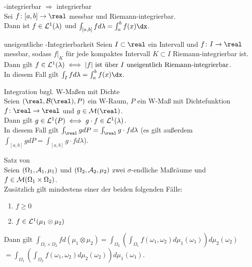 \begin{Satz}{-integrierbar $\Rightarrow$ integrierbar}\\
    Sei $f\colon [a, b] \rightarrow \real$ messbar und Riemann-integrierbar.\\
    Dann ist $f \in \mathcal{L}^1(\lambda)$ und $\int_{[a, b]} f d\lambda = \int_a^b f(x)\dx$.
\end{Satz}

\begin{Satz}{uneigentliche -Integrierbarkeit}
    Seien $I \subset \real$ ein Intervall und $f\colon I \rightarrow \real$ messbar,
    sodass $f|_K$ für jede kompaktes Intervall $K \subset I$ Riemann-integrierbar ist.\\
    Dann gilt $f \in \mathcal{L}^1(\lambda) \iff
    |f| \text{ ist über } I \text{ uneigentlich Riemann-integrierbar}$.\\
    In diesem Fall gilt $\int_I f d\lambda = \int_a^b f(x)\dx$.
\end{Satz}

\begin{Satz}{Integration bzgl. W-Maßen mit Dichte}\\
    Seien $(\real, \B(\real), P)$ ein W-Raum,
    $P$ ein W-Maß mit Dichtefunktion $f\colon \real \rightarrow \real$ und $g \in \M(\real)$.\\
    Dann gilt $g \in \mathcal{L}^1(P) \iff g \cdot f \in \mathcal{L}^1(\lambda)$.\\
    In diesem Fall gilt $\int_\real g dP = \int_\real g \cdot f d\lambda$
    (es gilt außerdem $\int_{[a, b]} g dP = \int_{[a, b]} g \cdot f d\lambda$).
\end{Satz}

\begin{Satz}{Satz von \upshape{}}\\
    Seien $(\Omega_1, \mathcal{A}_1, \mu_1)$ und $(\Omega_2, \mathcal{A}_2, \mu_2)$ zwei $\sigma$-endliche Maßräume
    und $f \in \mathcal{M}(\Omega_1 \times \Omega_2)$.\\
    Zusätzlich gilt mindestens einer der beiden folgenden Fälle:
    \begin{enumerate}[label=(\roman*)]
        \item
        $f \ge 0$

        \item
        $f \in \mathcal{L}^1(\mu_1 \otimes \mu_2)$
    \end{enumerate}
    Dann gilt
    $\int_{\Omega_1 \times \Omega_2} f d(\mu_1 \otimes \mu_2)
    = \int_{\Omega_2} \left(\int_{\Omega_1} f(\omega_1, \omega_2)
    d\mu_1(\omega_1)\right) d\mu_2(\omega_2)$\\
    $= \int_{\Omega_1} \left(\int_{\Omega_2} f(\omega_1, \omega_2)
    d\mu_2(\omega_2)\right) d\mu_1(\omega_1)$.
\end{Satz}

